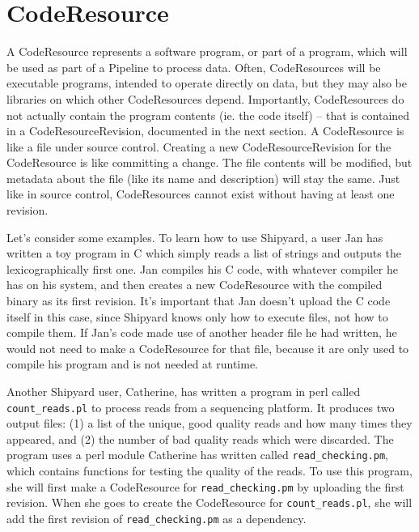\documentclass[12pt]{article}
\newcommand{\code}[1]{\texttt{#1}}
\begin{document}
\def\nodedist{1}
\def\sep{0.2}

\section*{CodeResource}

A CodeResource represents a software program, or part of a program, which will
be used as part of a Pipeline to process data. Often, CodeResources will be
executable programs, intended to operate directly on data, but they may also be
libraries on which other CodeResources depend. Importantly, CodeResources do
not actually contain the program contents (ie. the code itself) -- that is
contained in a CodeResourceRevision, documented in the next section. A
CodeResource is like a file under source control. Creating a new
CodeResourceRevision for the CodeResource is like committing a change. The file
contents will be modified, but metadata about the file (like its name and
description) will stay the same. Just like in source control, CodeResources
cannot exist without having at least one revision.

Let's consider some examples. To learn how to use Shipyard, a user Jan has
written a toy program in C which simply reads a list of strings and outputs the
lexicographically first one. Jan compiles his C code, with whatever compiler he
has on his system, and then creates a new CodeResource with the compiled binary
as its first revision. It's important that Jan doesn't upload the C code itself
in this case, since Shipyard knows only how to execute files, not how to
compile them. If Jan's code made use of another header file he had written, he
would not need to make a CodeResource for that file, because it are only used
to compile his program and is not needed at runtime. 

Another Shipyard user, Catherine, has written a program in perl called
\code{count\_reads.pl} to process reads from a sequencing platform. It produces
two output files: (1) a list of the unique, good quality reads and how many
times they appeared, and (2) the number of bad quality reads which were
discarded. The program uses a perl module Catherine has written called
\code{read\_checking.pm}, which contains functions for testing the quality of
the reads. To use this program, she will first make a CodeResource for
\code{read\_checking.pm} by uploading the first revision. When she goes to
create the CodeResource for \code{count\_reads.pl}, she will add the first
revision of \code{read\_checking.pm} as a dependency.
\end{document}
